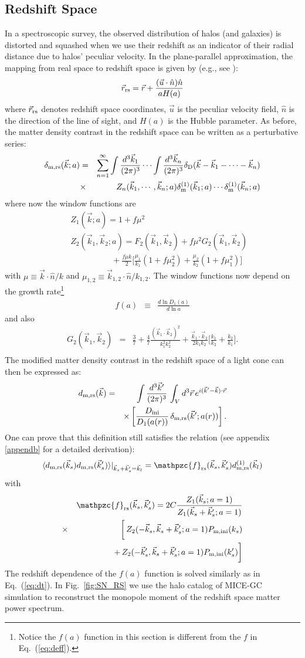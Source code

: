 \documentclass[prd,amsmath,amssymb,floatfix,superscriptaddress,nofootinbib,twocolumn]{revtex4-1}
\def\be{\begin{equation}}
\def\ee{\end{equation}}
\def\bea{\begin{eqnarray}}
\def\eea{\end{eqnarray}}
\newcommand{\m}{\rm m}
\newcommand{\rs}{\rm rs}
\newcommand{\ini}{\rm ini}
\newcommand{\vrr}{\vec{r}}
\newcommand{\vs}{\nonumber\\}
\newcommand{\vk}{\vec{k}}
\newcommand{\ec}[1]{Eq.~(\ref{eq:#1})}
\newcommand{\eql}[1]{\label{eq:#1}}
\newcommand{\rf}[1]{\ref{fig:#1}}
\begin{document}
\subsection{Redshift Space} \label{sec7}
In a spectroscopic survey, the observed distribution of halos (and galaxies) is distorted and squashed when we use their redshift as an indicator of their radial distance due to halos' peculiar velocity. In the plane-parallel approximation, the mapping from real space to redshift space is given by (e.g., see \cite{Bernardeau:2002rev}):
\be 
\vrr_{\rs} = \vrr + \frac{(\vec{u}\cdot \hat{n})\hat{n}}{aH(a)}
\ee 
where $\vrr_{\rs}$ denotes redshift space coordinates, $\vec{u}$ is the peculiar velocity field, $\hat{n}$ is the direction of the line of sight, and $H(a)$ is the Hubble parameter. As before, the matter density contrast in the redshift space can be written as a perturbative series:
\bea 
\delta_{\m,\rs}(\vk;a)&=&\sum_{n=1}^{\infty} \int\frac{d^3 \vk_1}{(2\pi)^3} \cdots \int \frac{d^3 \vk_n}{(2\pi)^3} \delta_{\rm D}(\vk-\vk_1 - \cdots -\vk_n) \nonumber \\
&\times & Z_n (\vk_1,\cdots,\vk_n;a)\delta_{\m}^{(1)}(\vk_1;a)\cdots \delta_{\m}^{(1)}(\vk_n;a) \eql{rspt} \vs
\eea
where now the window functions are
\bea 
&&Z_1(\vk;a)=1+f\mu^2 \\ 
&&Z_2(\vk_1,\vk_2;a)=F_{2}(\vk_1,\vk_2)+f\mu^2 G_2(\vk_1,\vk_2)\vs 
&&\qquad \qquad\quad+\frac{f\mu k}{2}\bigg[ \frac{\mu_1}{k_1}(1+f\mu_2^2)+\frac{\mu_2}{k_2}(1+f\mu_1^2)\bigg]
\eea 
with $\mu \equiv \vk \cdot \hat{n}/k$ and $\mu_{1,2} \equiv \vk_{1,2} \cdot \hat{n}/k_{1,2}$.  The window functions now depend on the growth rate\footnote{Notice the $f(a)$ function in this section is different from the $f$ in \ec{deff}.}
\bea 
f(a)&\equiv & \frac{d \ln D_{1}(a)}{d \ln a}\eea
and also
\bea
G_2(\vk_1,\vk_2)&=&\frac{3}{7}+\frac{4}{7}\frac{(\vk_1\cdot \vk_2)^2}{k_1^2 k_2^2}+\frac{\vk_1\cdot \vk_2}{2k_1k_2}\bigg[\frac{k_1}{k_2}+\frac{k_2}{k_1}\bigg].\vs
\eea 
The modified matter density contrast in the redshift space of a light cone can then be expressed as: 
\bea
d_{\rm m,\rs}(\vk) &=&\int \frac{d^3 \vk'}{(2\pi)^3}\, \int_{V} d^3\vrr \,  e^{i(\vk'-\vk) \cdot\vrr} \vs
&&\times  \left[ \frac{D_{\ini}}{D_{1}(a(r))}  
\, \delta_{\rm m,\rs}(\vk';a(r))\right].
\eea
One can prove that this definition still satisfies the relation (see appendix \ref{appendb} for a detailed derivation):
\be 
\langle d_{\rm m,\rs }(\vk_s)d_{\rm m,\rs }(\vk_s') \rangle|_{\vk_s+\vk_s'=\vk_l} =\mathpzc{f}_{\rs}(\vec{k}_s,\vec{k}_s'){d}^{(1)}_{\rm m,\rs}(\vec{k}_l) \eql{2ptddrs}
\ee 
with 
\bea
&&\mathpzc{f}_{\rs}(\vec{k}_s,\vec{k}_s')=2C\frac{Z_{1}(\vk_s;a=1)}{Z_{1}(\vk_s+\vk_s';a=1)}\vs
&\times&\bigg[\,Z_2(-\vec{k}_s,\vec{k}_s+\vec{k}_s';a=1)P_{\rm m,ini}(k_s)\vs
&&+\,Z_2(-\vec{k}_s',\vec{k}_s+\vec{k}_s';a=1)P_{\rm m,ini}(k_s')\bigg]  \vs   
\eea 
The redshift dependence of the $f(a)$ function is solved similarly as in \ec{dt}. In Fig.~\rf{SN_RS} we use the halo catalog of MICE-GC simulation to reconstruct the monopole moment of the redshift space matter power spectrum.
\end{document}
